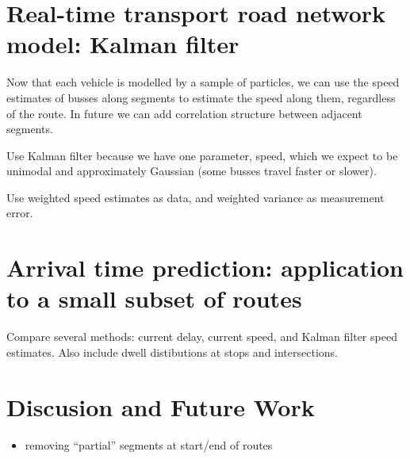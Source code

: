 \documentclass{IEEEtran}\usepackage[]{graphicx}\usepackage[]{color}
\begin{document}
\section{Real-time transport road network model: Kalman filter}
\label{sec:kf}

Now that each vehicle is modelled by a sample of particles,
we can use the speed estimates of busses along segments to estimate
the speed along them, regardless of the route.
In future we can add correlation structure between adjacent segments.

Use Kalman filter because we have one parameter, speed, 
which we expect to be unimodal and approximately Gaussian
(some busses travel faster or slower).

Use weighted speed estimates as data,
and weighted variance as measurement error.



\section{Arrival time prediction: application to a small subset of routes}
\label{sec:results}


Compare several methods:
current delay, current speed, and Kalman filter speed estimates.
Also include dwell distibutions at stops and intersections.



\section{Discusion and Future Work}
\label{sec:discussion}

\begin{itemize}
\item removing ``partial'' segments at start/end of routes
\end{itemize}





\end{document}

